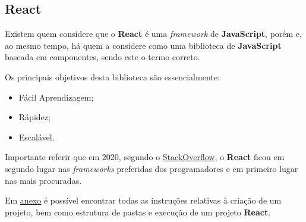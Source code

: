 \subsection{React}

\begin{minipage}[t]{.3\textwidth}
\end{minipage}
\begin{minipage}[t]{.7\textwidth}
	\minipagerestore
	Existem quem considere que o \textbf{React} é uma \textit{framework} de \textbf{JavaScript}, porém e, ao mesmo tempo, há quem a considere como uma biblioteca de \textbf{JavaScript} baseada em componentes, sendo este o termo correto.

	Os principais objetivos desta biblioteca são essencialmente:

	\begin{itemize}
		\item Fácil Aprendizagem;
		\item Rápidez;
		\item Escalável.
	\end{itemize}
\end{minipage}

\vspace{0.2cm}

Importante referir que em 2020, segundo o \href{https://insights.stackoverflow.com/survey/2020#technology-most-loved-dreaded-and-wanted-web-frameworks-loved2}{StackOverflow}, o \textbf{React} ficou em segundo lugar nas \textit{frameworks} preferidas dos programadores e em primeiro lugar nas mais procuradas.

Em \underline{\hyperref[reactAttachments]{anexo}} é possível encontrar todas as instruções relativas à criação de um projeto, bem como estrutura de pastas e execução de um projeto \textbf{React}.